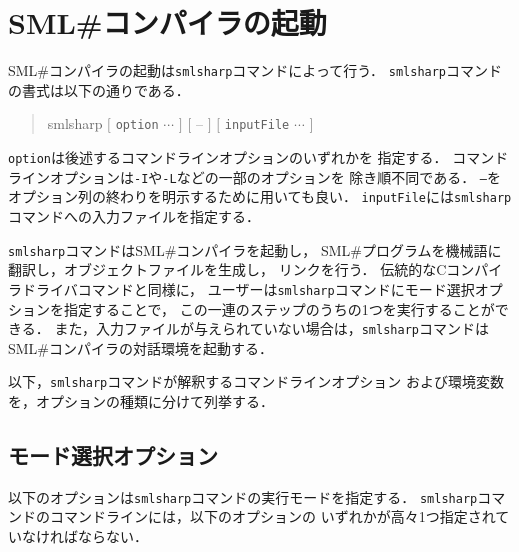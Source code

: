 \documentclass{jbook}
\newif\ifjp
\newcommand{\txt}[2]{#1}
\newcommand{\smlsharp}{SML\#}
\newcommand{\term}[1]{\mbox{{\tt #1}}}
\newenvironment{program}{\begin{quote}\begin{tt}}%
                        {\end{tt}\end{quote}}
\begin{document}
\chapter{\txt{\smlsharp{}コンパイラの起動}{\smlsharp{} Command}}
\ifjp%

	\smlsharp{}コンパイラの起動は{\tt smlsharp}コマンドによって行う．
	{\tt smlsharp}コマンドの書式は以下の通りである．
\begin{program}
smlsharp $[$ \term{option} $\cdots$ $]$ $[$ -- $]$ $[$ \term{inputFile} $\cdots$ $]$
\end{program}
	\term{option}は後述するコマンドラインオプションのいずれかを
指定する．
	コマンドラインオプションは{\tt -I}や{\tt -L}などの一部のオプションを
除き順不同である．
	{\tt --}をオプション列の終わりを明示するために用いても良い．
	\term{inputFile}には{\tt smlsharp}コマンドへの入力ファイルを指定する．

	{\tt smlsharp}コマンドは\smlsharp{}コンパイラを起動し，
\smlsharp{}プログラムを機械語に翻訳し，オブジェクトファイルを生成し，
リンクを行う．
	伝統的なCコンパイラドライバコマンドと同様に，
ユーザーは{\tt smlsharp}コマンドにモード選択オプションを指定することで，
この一連のステップのうちの1つを実行することができる．
	また，入力ファイルが与えられていない場合は，{\tt smlsharp}コマンドは
\smlsharp{}コンパイラの対話環境を起動する．

	以下，{\tt smlsharp}コマンドが解釈するコマンドラインオプション
および環境変数を，オプションの種類に分けて列挙する．

\section{モード選択オプション}

	以下のオプションは{\tt smlsharp}コマンドの実行モードを指定する．
	{\tt smlsharp}コマンドのコマンドラインには，以下のオプションの
いずれかが高々1つ指定されていなければならない．
\end{document}

